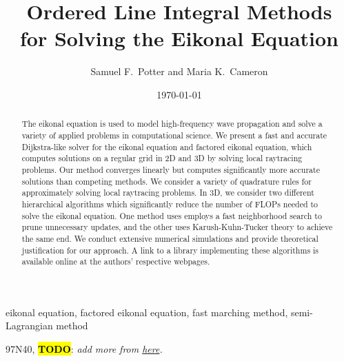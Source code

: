 \documentclass[eikonal.tex]{subfiles}
\begin{document}
\title{Ordered Line Integral Methods \\ for Solving the Eikonal Equation}
\author{Samuel F.\ Potter and Maria K.\ Cameron}
\date{\today}

\maketitle

\begin{abstract}
  The eikonal equation is used to model high-frequency wave
  propagation and solve a variety of applied problems in computational
  science. We present a fast and accurate Dijkstra-like solver for the
  eikonal equation and factored eikonal equation, which computes
  solutions on a regular grid in 2D and 3D by solving local raytracing
  problems. Our method converges linearly but computes significantly
  more accurate solutions than competing methods. We consider a
  variety of quadrature rules for approximately solving local
  raytracing problems. In 3D, we consider two different hierarchical
  algorithms which significantly reduce the number of FLOPs needed to
  solve the eikonal equation. One method uses employs a fast
  neighborhood search to prune unnecessary updates, and the other uses
  Karush-Kuhn-Tucker theory to achieve the same end. We conduct
  extensive numerical simulations and provide theoretical
  justification for our approach. A link to a library implementing
  these algorithms is available online at the authors' respective
  webpages.
\end{abstract}

\begin{keywords}
  eikonal equation, factored eikonal equation, fast marching method,
  semi-Lagrangian method
\end{keywords}

\begin{AMS}
  97N40, \hl{\textbf{TODO}}: \emph{add more from
    \href{https://mathscinet.ams.org/msc/pdfs/classifications2010.pdf}{here}.} %
\end{AMS}
\end{document}
